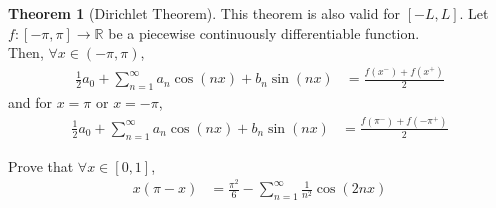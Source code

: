\documentclass[fleqn, a4paper, 12pt, twoside]{article}
\theoremstyle{definition}
\theoremstyle{theorem}
\newtheorem{theorem}{Theorem}
\begin{document}
\begin{theorem}[Dirichlet Theorem]
	\marginnote
	{
		This theorem is also valid for $[-L,L]$.
	}
	Let $f : [-\pi,\pi] \to \mathbb{R}$ be a piecewise continuously differentiable function.\\
	Then, $\forall x \in (-\pi,\pi)$,
	\begin{align*}
		\frac{1}{2} a_0 + \sum\limits_{n = 1}^{\infty} a_n \cos(n x) + b_n \sin(n x) &= \frac{f(x^-) + f(x^+)}{2}
	\end{align*}
	and for $x = \pi$ or $x = -\pi$,
	\begin{align*}
		\frac{1}{2} a_0 + \sum\limits_{n = 1}^{\infty} a_n \cos(n x) + b_n \sin(n x) &= \frac{f(\pi^-) + f(-\pi^+)}{2}
	\end{align*}
	\label{Dirichlet_Theorem}
\end{theorem}

\begin{question}
	Prove that $\forall x \in [0,1]$,
	\begin{align*}
		x (\pi - x) &= \frac{\pi^2}{6} - \sum\limits_{n = 1}^{\infty} \frac{1}{n^2} \cos(2 n x)
	\end{align*}
\end{question}
\end{document}
